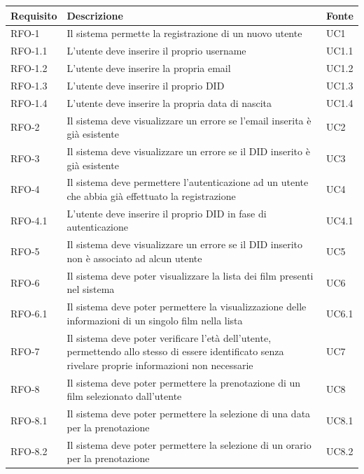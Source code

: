 \begin{center}
\label{tab:requisiti-funzionali}
\begin{tabularx}{\textwidth}{|>{\hsize=0.4\hsize\centering\arraybackslash}X|>{\hsize=2.2\hsize\centering}X|>{\hsize=0.4\hsize\centering\arraybackslash}X|}
\hline
\textbf{Requisito} & \textbf{Descrizione} & \textbf{Fonte}\\
\hline
RFO-1     & Il sistema permette la registrazione di un nuovo utente & UC1 \\
\hline
RFO-1.1   & L'utente deve inserire il proprio username & UC1.1 \\
\hline
RFO-1.2   & L'utente deve inserire la propria email & UC1.2 \\
\hline
RFO-1.3   & L'utente deve inserire il proprio DID & UC1.3 \\
\hline
RFO-1.4   & L'utente deve inserire la propria data di nascita & UC1.4 \\
\hline
RFO-2   & Il sistema deve visualizzare un errore se l'email inserita è già esistente & UC2 \\
\hline
RFO-3   & Il sistema deve visualizzare un errore se il DID inserito è già esistente & UC3 \\
\hline
RFO-4   & Il sistema deve permettere l'autenticazione ad un utente che abbia già effettuato la registrazione & UC4 \\
\hline
RFO-4.1   & L'utente deve inserire il proprio DID in fase di autenticazione & UC4.1 \\
\hline
RFO-5   & Il sistema deve visualizzare un errore se il DID inserito non è associato ad alcun utente & UC5 \\
\hline
RFO-6 & Il sistema deve poter visualizzare la lista dei film presenti nel sistema & UC6 \\
\hline
RFO-6.1 & Il sistema deve poter permettere la visualizzazione delle informazioni di un singolo film nella lista & UC6.1 \\
\hline
RFO-7 & Il sistema deve poter verificare l'età dell'utente, permettendo allo stesso di essere identificato senza rivelare proprie informazioni non necessarie & UC7 \\
\hline
RFO-8 & Il sistema deve poter permettere la prenotazione di un film selezionato dall'utente & UC8 \\
\hline
RFO-8.1 & Il sistema deve poter permettere la selezione di una data per la prenotazione & UC8.1 \\
\hline
RFO-8.2 & Il sistema deve poter permettere la selezione di un orario per la prenotazione & UC8.2 \\

\end{tabularx}
\end{center}
